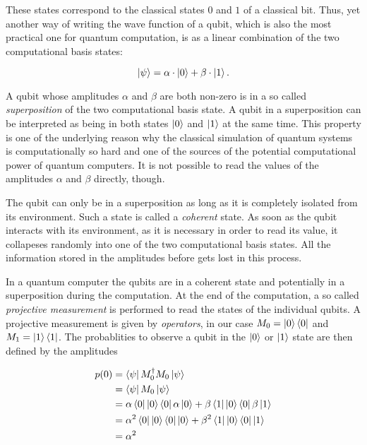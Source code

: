 These states correspond to the classical states $0$ and $1$ of a classical bit. Thus, yet another way of writing the wave
function of a qubit, which is also the most practical one for quantum computation, is as a linear combination of the
two computational basis states:

\begin{equation}
  \Ket{\psi} = \alpha \cdot \Ket{0} + \beta \cdot \Ket{1}.
\end{equation}

A qubit whose amplitudes $\alpha$ and $\beta$ are both non-zero is in a so called \textit{superposition} of the two
computational basis state. A qubit in a superposition can be interpreted as
 being in both states $\Ket{0}$ and $\Ket{1}$ at the same time.
This property is one of the underlying reason why the classical simulation of
quantum systems is computationally so hard and 
one of the sources of the potential computational power of quantum computers.
It is not possible to read the values of the amplitudes $\alpha$ and $\beta$
directly, though.

The qubit can only be in a superposition as long as it is completely isolated
from its environment. Such a state is called a \textit{coherent} state. As
soon as the qubit interacts with its environment, as it is necessary in order to read
its value, it collapeses randomly into one of the two computational basis
states. All the information stored in the amplitudes before gets lost in this process.

In a quantum computer the qubits are in a coherent state and potentially in a superposition during the computation. At the end of the computation, a so called
\textit{projective measurement} is performed to read the states of the individual qubits. A projective measurement is given
by \textit{operators}, in our case $M_0 = \Ket{0}\Bra{0}$ and $M_1 = \Ket{1}\Bra{1}$. The probablities to observe a qubit in the $\Ket{0}$ or
$\Ket{1}$ state are then defined by the amplitudes

\begin{align}
  p(0) &= \Bra{\psi} M_0^{\dagger}M_0 \Ket{\psi} \\
       &=  \Bra{\psi} M_0 \Ket{\psi} \\
       &= \alpha \Bra{0} \Ket{0} \Bra{0} \alpha \Ket{0} + \beta \Bra{1} \Ket{0} \Bra{0} \beta \Ket{1} \\
       &= \alpha^2 \Bra{0} \Ket{0} \Bra{0} \Ket{0} + \beta^2 \Bra{1} \Ket{0} \Bra{0} \Ket{1} \\
       &= \alpha^2
\end{align}

